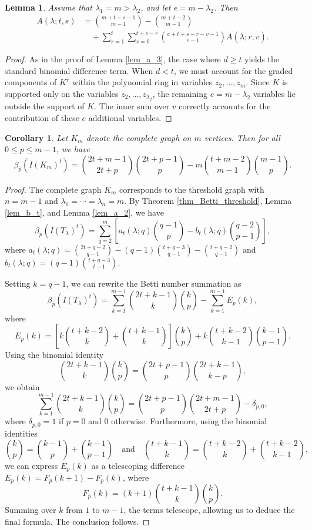 \documentclass[12pt,amscd]{amsart}
\newtheorem{cor}[thm]{Corollary}
\newtheorem{lem}[thm]{Lemma}
\theoremstyle{definition}
\numberwithin{equation}{section}
\begin{document}
\begin{lem}\label{lem_a_4} 
Assume that $\lambda_1 = m > \lambda_2$, and let $e = m - \lambda_2$. Then 
\begin{align*}
A(\lambda; t, s) &= \binom{m + t + s - 1}{m - 1} - \binom{m + t - 2}{m - 1} \\
&\quad + \sum_{r = 1}^t \sum_{v = 0}^{t+s-r} \binom{e + t + s - r - v - 1}{e - 1} A(\bar{\lambda}; r, v).
\end{align*}
\end{lem}

\begin{proof}
As in the proof of Lemma \ref{lem_a_3}, the case where $d \ge t$ yields the standard binomial difference term. When $d < t$, we must account for the graded components of $K^r$ within the polynomial ring in variables $z_2, \ldots, z_m$. Since $K$ is supported only on the variables $z_2, \ldots, z_{\lambda_2}$, the remaining $e = m - \lambda_2$ variables lie outside the support of $K$. The inner sum over $v$ correctly accounts for the contribution of these $e$ additional variables.
\end{proof}

\begin{cor}\label{cor_Betti_complete} 
Let $K_m$ denote the complete graph on $m$ vertices. Then for all $0 \le p \le m - 1$, we have
\[
\beta_p(I(K_m)^t) = \binom{2t + m - 1}{2t + p}\binom{2t + p - 1}{p} - m\binom{t + m - 2}{m - 1}\binom{m - 1}{p}.
\]
\end{cor}

\begin{proof}
The complete graph $K_m$ corresponds to the threshold graph with $n = m - 1$ and $\lambda_1 = \cdots = \lambda_n = m$. By Theorem \ref{thm_Betti_threshold}, Lemma \ref{lem_b_t}, and Lemma \ref{lem_a_2}, we have
\[
\beta_p(I(T_\lambda)^t) = \sum_{q=2}^m \left[ a_t(\lambda; q)\binom{q-1}{p} - b_t(\lambda; q)\binom{q-2}{p-1} \right],
\]
where $a_t(\lambda; q) = \binom{2t + q - 2}{q - 1} - (q - 1)\binom{t + q - 3}{q - 1} - \binom{t + q - 2}{q - 1}$ and $b_t(\lambda; q) = (q - 1)\binom{t + q - 3}{t - 1}$. 

Setting $k = q - 1$, we can rewrite the Betti number summation as
\[
\beta_p(I(T_\lambda)^t) = \sum_{k=1}^{m-1} \binom{2t + k - 1}{k}\binom{k}{p} - \sum_{k=1}^{m-1} E_p(k),
\]
where
\[
E_p(k) = \left[ k\binom{t + k - 2}{k} + \binom{t + k - 1}{k} \right]\binom{k}{p} + k\binom{t + k - 2}{k - 1}\binom{k - 1}{p - 1}.
\]
Using the binomial identity 
\[
\binom{2t + k - 1}{k}\binom{k}{p} = \binom{2t + p - 1}{p}\binom{2t + k - 1}{k - p},
\]
we obtain
\[
\sum_{k=1}^{m-1} \binom{2t + k - 1}{k}\binom{k}{p} = \binom{2t + p - 1}{p}\binom{2t + m - 1}{2t + p} - \delta_{p,0},
\]
where $\delta_{p,0} = 1$ if $p = 0$ and $0$ otherwise. Furthermore, using the binomial identities 
\[
\binom{k}{p} = \binom{k-1}{p} + \binom{k-1}{p-1} \quad \text{and} \quad \binom{t+k-1}{k} = \binom{t+k-2}{k} + \binom{t+k-2}{k-1},
\]
we can express $E_p(k)$ as a telescoping difference $E_p(k) = F_p(k+1) - F_p(k)$, where
\[
F_p(k) = (k + 1)\binom{t + k - 1}{k}\binom{k}{p}.
\]
Summing over $k$ from $1$ to $m-1$, the terms telescope, allowing us to deduce the final formula. The conclusion follows.
\end{proof}
\end{document}
